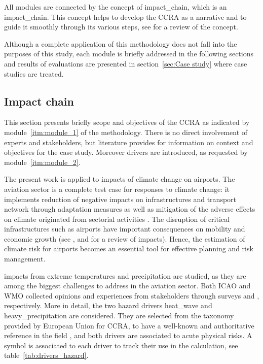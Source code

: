 All modules are connected by the concept of \gls{impact_chain}, which is an \glsdesc{impact_chain}. This concept helps to develop the \gls{CCRA} as a narrative and to guide it smoothly through its various steps, see \cite[217-224]{2022KondrupClimateAdaptation} for a review of the concept.

Although a complete application of this methodology does not fall into the purposes of this study, each module is briefly addressed in the following sections and results of evaluations are presented in section~\ref{sec:Case study} where case studies are treated.



\subsection{Impact chain}
\label{sec:Impact chain}
This section presents briefly scope and objectives of the \gls{CCRA} as indicated by module~\ref{itm:module_1} of the methodology. There is no direct involvement of experts and stakeholders, but literature provides for information on context and objectives for the case study. Moreover \glspl{driver} are introduced, as requested by module~\ref{itm:module_2}.

The present work is applied to impacts of climate change on airports.
The aviation sector is a complete test case for responses to climate change: it implements reduction of negative \glspl{impact} on infrastructures and transport network through adaptation measures as well as mitigation of the adverse effects on climate originated from sectorial activities \cite{2022ICAOICAOEnvironmental}. The disruption of critical infrastructures such as airports have important consequences on mobility and economic growth (see \cite{2018ICAOClimateAdaptation}, \cite[15]{2016BurbidgeAdaptingEuropean} and \cite[548]{2022DeVivoRiskAssessment} for a review of impacts). Hence, the estimation of climate \gls{risk} for airports becomes an essential tool for effective planning and risk management.

\Glspl{impact} from extreme temperatures and precipitation are studied, as they are among the biggest challenges to address in the aviation sector. Both \Gls{ICAO} and \gls{WMO} collected opinions and experiences from stakeholders through surveys \cite[62]{2018ICAOClimateAdaptation} and \cite[34]{2020WorldMeteorologicalOrganizationWMOOutcomesOf}, respectively.
More in detail, the two \gls{hazard} \glspl{driver} \gls{heat_wave} and \gls{heavy_precipitation} are considered. They are selected from the taxonomy provided by European Union for \gls{CCRA}, to have a well-known and authoritative reference in the field \cite[177]{2024EU20212139}, and both drivers are associated to acute physical risks. A symbol is associated to each \gls{driver} to track their use in the calculation, see table~\ref{tab:drivers_hazard}.

